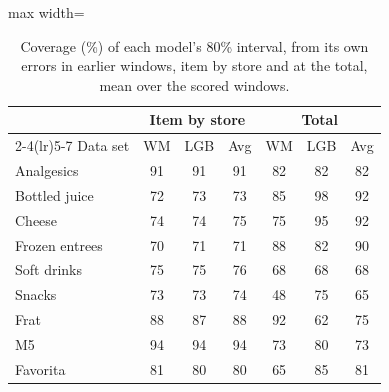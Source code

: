 \begin{table}[t]
\centering\footnotesize\setlength{\tabcolsep}{3pt}
\caption{Coverage (\%) of each model's 80\% interval, from its own errors in earlier windows, item by store and at
the total, mean over the scored windows.}
\label{tab:sup-intervals}
\begin{adjustbox}{max width=\columnwidth}\begin{tabular}{lcccccc}
\toprule
 & \multicolumn{3}{c}{Item by store} & \multicolumn{3}{c}{Total}\\
\cmidrule(lr){2-4}\cmidrule(lr){5-7}
Data set & WM & LGB & Avg & WM & LGB & Avg\\
\midrule
Analgesics & 91 & 91 & 91 & 82 & 82 & 82 \\
Bottled juice & 72 & 73 & 73 & 85 & 98 & 92 \\
Cheese & 74 & 74 & 75 & 75 & 95 & 92 \\
Frozen entrees & 70 & 71 & 71 & 88 & 82 & 90 \\
Soft drinks & 75 & 75 & 76 & 68 & 68 & 68 \\
Snacks & 73 & 73 & 74 & 48 & 75 & 65 \\
Frat & 88 & 87 & 88 & 92 & 62 & 75 \\
M5 & 94 & 94 & 94 & 73 & 80 & 73 \\
Favorita & 81 & 80 & 80 & 65 & 85 & 81 \\
\bottomrule
\end{tabular}\end{adjustbox}
\end{table}
